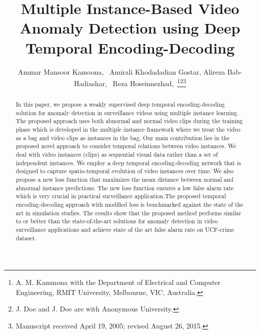 \documentclass[journal]{IEEEtran}
\begin{document}
\title{Multiple Instance-Based Video Anomaly Detection using Deep Temporal Encoding-Decoding}


\author{Ammar Mansoor Kamoona,~
        Amirali Khodadadian Gostar, Alireza Bab-Hadiashar,~
        Reza Hoseinnezhad,~\thanks{A. M. Kammona with the Department
of Electrical and Computer Engineering, RMIT University, Melbourne, VIC, Australia.}\thanks{J. Doe and J. Doe are with Anonymous University.}\thanks{Manuscript received April 19, 2005; revised August 26, 2015.}}



















\maketitle

\begin{abstract}
In this paper, we propose a weakly supervised deep temporal encoding-decoding solution for anomaly detection in surveillance videos using multiple instance learning. The proposed approach uses both abnormal and normal video clips during the training phase which is developed in the multiple instance framework where we treat the video as a bag and video clips as instances in the bag. Our main contribution lies in the proposed novel approach to consider temporal relations between video instances. We deal with video instances (clips) as sequential visual data rather than a set of independent instances. We employ a deep temporal encoding-decoding network that is designed to capture spatio-temporal evolution of video instances over time. We also propose a new loss function that maximizes the mean distance between normal and abnormal instance predictions. The new loss function ensures a low false alarm rate which is very crucial in practical surveillance application.The proposed temporal encoding-decoding approach with modified loss is benchmarked against the state of the art in simulation studies. The results show that the proposed method performs similar to or better than the state-of-the-art solutions for anomaly detection in video surveillance applications and achieve state of the art false alarm rate on UCF-crime dataset. 
\end{abstract}
\end{document}
